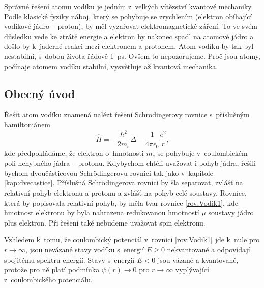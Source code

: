 Správné řešení atomu vodíku je jedním z~velkých vítězství kvantové mechaniky. Podle klasické fyziky náboj, který se pohybuje se zrychlením (elektron obíhající vodíkové jádro -- proton), by měl vyzařovat elektromagnetické záření. To ve svém důsledku vede ke ztrátě energie a elektron by nakonec spadl na atomové jádro a došlo by k~jaderné reakci mezi elektronem a protonem. Atom vodíku by tak byl nestabilní, s~dobou života řádově 1~ps. Ovšem to nepozorujeme. Proč jsou atomy, počínaje atomem vodíku stabilní, vysvětluje až kvantová mechanika.

\subsection{Obecný úvod}
\label{kap:ObecnyUvod}

Řešit atom vodíku znamená nalézt řešení Schrödingerovy rovnice s~příslušným hamiltoniánem
\begin{equation}
\hat{H} = -\frac{\hbar^2}{2m_e}\Delta - \frac{1}{4\pi\epsilon_0}\frac{e^2}{r} \mbox{,}
\label{rov:Vodik1}
\end{equation}
kde předpokládáme, že elektron o~hmotnosti $m_e$ se pohybuje v~coulombickém poli nehybného jádra -- protonu. Kdybychom chtěli uvažovat i pohyb jádra, řešili bychom dvoučásticovou Schrödingerovu rovnici tak jako v~kapitole \ref{kap:dvecastice}. Příslušná Schrödingerova rovnici by šla separovat, zvlášť na relativní pohyb elektronu a protonu a zvlášť na pohyb celé soustavy. Rovnice, která by popisovala relativní pohyb, by měla tvar rovnice \eqref{rov:Vodik1}, kde hmotnost elektronu by byla nahrazena redukovanou hmotností $\mu$ soustavy jádro plus elektron. Při řešení také nebudeme uvažovat spin elektronu.

Vzhledem k~tomu, že coulombický potenciál v~rovnici \eqref{rov:Vodik1} jde k~nule pro $r \rightarrow \infty$, jsou nevázané stavy vodíku s~energií $E\geq0$ nekvantované a odpovídají spojitému spektru energií. Stavy s~energií $E<0$ jsou vázané a kvantované, protože pro ně platí podmínka $\psi(r) \rightarrow 0$ pro $r \rightarrow \infty$ vyplývající z~coulombického potenciálu.

